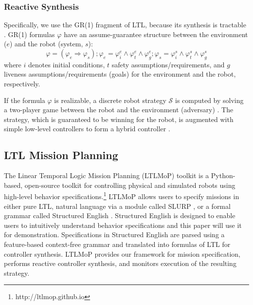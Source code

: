 \subsubsection*{Reactive Synthesis}
Specifically, we use the GR(1) fragment of LTL, because its synthesis is tractable \cite{piterman_06}. GR(1) formulas $\varphi$ have an assume-guarantee structure between the environment ($e$) and the robot (system, $s$):
$$
\varphi = (\varphi_e \Rightarrow \varphi_s); \varphi_e = \varphi_i^e \wedge \varphi_t^e \wedge \varphi_g^e; \varphi_s = \varphi_i^s \wedge \varphi_t^s \wedge \varphi_g^s
$$
where $i$ denotes initial conditions, $t$ safety assumptions/requirements, and $g$ liveness assumptions/requirements (goals) for the environment and the robot, respectively.


If the formula $\varphi$ is realizable, a discrete robot strategy $\mathcal{S}$ is computed by solving a two-player game between the robot and the environment (adversary) \cite{piterman_06}. The strategy, which is guaranteed to be winning for the robot, is augmented with simple low-level controllers to form a hybrid controller \cite{KGFP_TRO09}.

\subsection{LTL Mission Planning}\label{preliminariesB}

The Linear Temporal Logic Mission Planning (LTLMoP) toolkit \cite{Finucane2010} is a Python-based, open-source toolkit for controlling physical and simulated robots using high-level behavior specifications.\footnote{http://ltlmop.github.io} 
LTLMoP allows users to specify missions in either pure LTL, natural language via a module called SLURP \cite{RamanRSS2013}, or a formal grammar called Structured English \cite{KGFP2008AR}. 
Structured English is designed to enable users to intuitively understand behavior specifications and this paper will use it for demonstration. 
Specifications in Structured English are parsed using a feature-based context-free grammar and translated into formulas of LTL for controller synthesis. 
LTLMoP provides our framework for mission specification, performs reactive controller synthesis, and monitors execution of the resulting strategy. 

